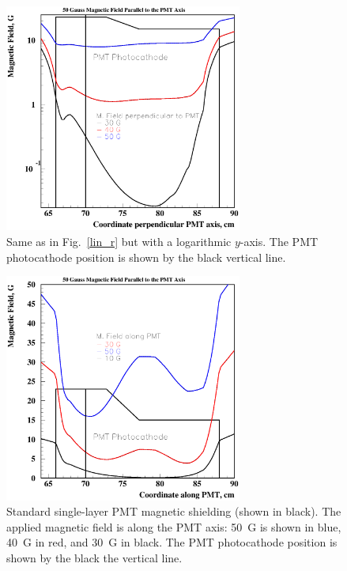 \begin{figure}
\hspace{0.5cm}
\begin{centering}
\includegraphics[height=7.5cm]{Magnetic-shielding/shield_r_log.eps}
\vspace{0.5cm}
\caption{\small{Same as in Fig.~\ref{lin_r} but with a logarithmic $y$-axis.
The PMT photocathode position is shown by the black vertical line.}}
\label{log_r}
\end{centering}
\end{figure}

\begin{figure}
\hspace{0.5cm}
\begin{centering}
\includegraphics[height=7.5cm]{Magnetic-shielding/shield_z_lin.eps}
\vspace{0.5cm}
\caption{\small{Standard single-layer PMT magnetic shielding (shown in black).
The applied magnetic field is along the PMT axis: 50~G is shown in blue, 
40~G in red, and 30~G in black.  The PMT photocathode position is shown by 
the black the vertical line.}}
\label{lin_z}
\end{centering}
\end{figure}

